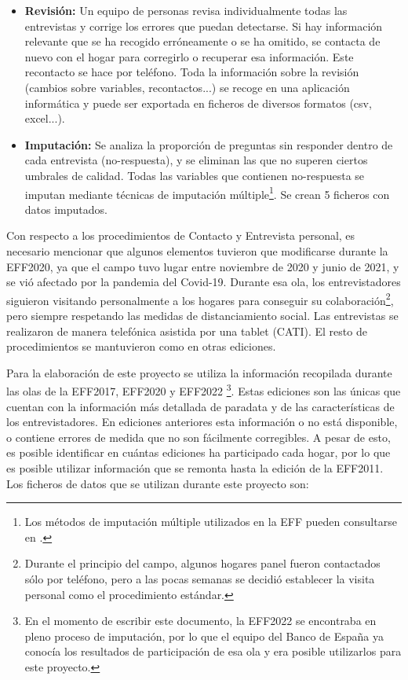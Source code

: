 \begin{itemize}
    \item \textbf{Revisión:} Un equipo de personas revisa individualmente todas las entrevistas y corrige los errores que puedan detectarse. Si hay información relevante que se ha recogido erróneamente o se ha omitido, se contacta de nuevo con el hogar para corregirlo o recuperar esa información. Este recontacto se hace por teléfono. Toda la información sobre la revisión (cambios sobre variables, recontactos...) se recoge en una aplicación informática y puede ser exportada en ficheros de diversos formatos (csv, excel...).
    \item \textbf{Imputación:} Se analiza la proporción de preguntas sin responder dentro de cada entrevista (no-respuesta), y se eliminan las que no superen ciertos umbrales de calidad. Todas las variables que contienen no-respuesta se imputan mediante técnicas de imputación múltiple\footnote{Los métodos de imputación múltiple utilizados en la EFF pueden consultarse en \cite{barcelo2006imputation}.}. Se crean 5 ficheros con datos imputados.
\end{itemize}

Con respecto a los procedimientos de Contacto y Entrevista personal, es necesario mencionar que algunos elementos tuvieron que modificarse durante la EFF2020, ya que el campo tuvo lugar entre noviembre de 2020 y junio de 2021, y se vió afectado por la pandemia del Covid-19. Durante esa ola, los entrevistadores siguieron visitando personalmente a los hogares para conseguir su colaboración\footnote{Durante el principio del campo, algunos hogares panel fueron contactados sólo por teléfono, pero a las pocas semanas se decidió establecer la visita personal como el procedimiento estándar.}, pero siempre respetando las medidas de distanciamiento social. Las entrevistas se realizaron de manera telefónica asistida por una tablet (CATI). El resto de procedimientos se mantuvieron como en otras ediciones.

Para la elaboración de este proyecto se utiliza la información recopilada durante las olas de la EFF2017, EFF2020 y EFF2022 \footnote{En el momento de escribir este documento, la EFF2022 se encontraba en pleno proceso de imputación, por lo que el equipo del Banco de España ya conocía los resultados de participación de esa ola y era posible utilizarlos para este proyecto.}. Estas ediciones son las únicas que cuentan con la información más detallada de paradata y de las características de los entrevistadores. En ediciones anteriores esta información o no está disponible, o contiene errores de medida que no son fácilmente corregibles. A pesar de esto, es posible identificar en cuántas ediciones ha participado cada hogar, por lo que es posible utilizar información que se remonta hasta la edición de la EFF2011. Los ficheros de datos que se utilizan durante este proyecto son:

